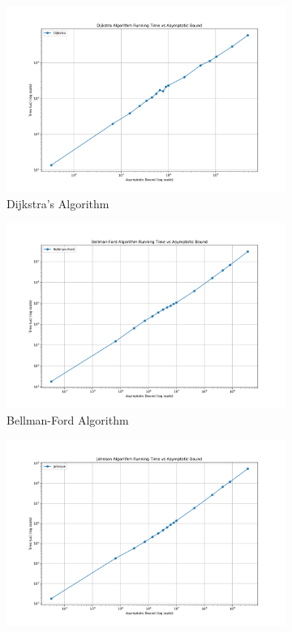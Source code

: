\documentclass[11pt]{article}
\theoremstyle{plain}
\begin{document}
\begin{figure}[H]
  \centering
  \begin{subfigure}[b]{0.45\textwidth}
      \centering
      \includegraphics[width=\textwidth]{../results/Dijkstra_running_time_bound.png}
      \caption{Dijkstra's Algorithm}
  \end{subfigure}
  \hfill
  \begin{subfigure}[b]{0.45\textwidth}
      \centering
      \includegraphics[width=\textwidth]{../results/Bellman-Ford_running_time_bound.png}
      \caption{Bellman-Ford Algorithm}
  \end{subfigure}
  \vfill
  \begin{subfigure}[b]{0.45\textwidth}
      \centering
      \includegraphics[width=\textwidth]{../results/Johnson_running_time_bound.png}

\end{subfigure}
\end{figure}
\end{document}
